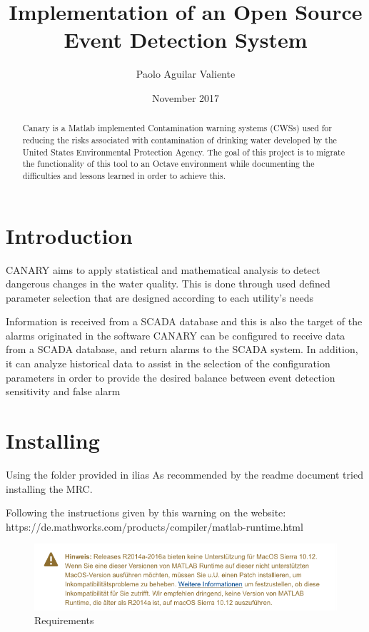 \documentclass[runningheads]{llncs}
\begin{document}
\mainmatter
\title{Implementation of an Open Source Event Detection System}
\author{Paolo Aguilar Valiente}
\date{November 2017}
\maketitle

\begin{abstract} Canary is a Matlab implemented Contamination warning systems (CWSs) used for reducing the risks associated with contamination of drinking water developed by the United States Environmental Protection Agency. The goal of this project is to migrate the functionality of this tool to an Octave environment while documenting the difficulties and lessons learned in order to achieve this.
\end{abstract}

\section{Introduction}
CANARY aims to apply statistical and mathematical analysis to detect dangerous changes in the water quality. This is done through used defined parameter selection that are designed according to each utility's needs

Information is received from a SCADA database and this is also the target of the alarms originated in the software
CANARY can be configured to receive
data from a SCADA database, and return alarms to the SCADA system. In addition, it
can analyze historical data to assist in the selection of the configuration parameters in
order to provide the desired balance between event detection sensitivity and false alarm 
\section{Installing}

Using the folder provided in ilias
As recommended by the readme document tried installing the MRC.

Following the instructions given by this warning on the website: https://de.mathworks.com/products/compiler/matlab-runtime.html

\begin{figure}
\includegraphics[width=0.9\linewidth]{img/hinweis.png}
\caption{Requirements}
\label{fig:req1}
\end{figure}
\end{document}
